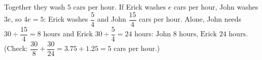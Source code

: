 Together they wash $5$ cars per hour. If Erick washes $e$ cars per hour, John washes $3e$, so $4e=5$: Erick washes $\dfrac54$ and John $\dfrac{15}4$ cars per hour. Alone, John needs $30\div\dfrac{15}{4}=8$ hours and Erick $30\div\dfrac54=24$ hours: $\boxed{\text{John }8\text{ hours, Erick }24\text{ hours}}$. (Check: $\dfrac{30}{8}+\dfrac{30}{24}=3.75+1.25=5$ cars per hour.)
